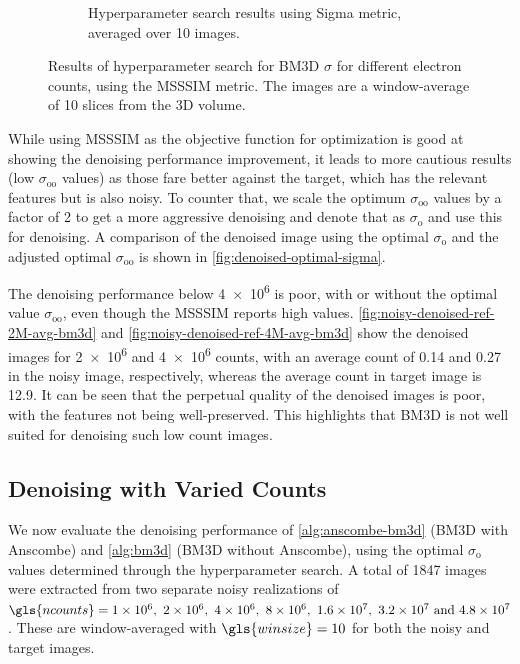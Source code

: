 \begin{figure}
\begin{subfigure}[t]{0.49\linewidth}
        \caption{Hyperparameter search results using Sigma metric, averaged over 10 images.}
        \label{fig:hyperparameter-sigma-averaged-10-images}
    \end{subfigure}
    \caption{Results of hyperparameter search for \gls{BM3D} $\sigma$ for different electron counts, using the \gls{MSSSIM} metric. The images are a window-average of \num{10} slices from the 3D volume.}
    \label{fig:hyperparameter-averaged-10-images}
\end{figure}



While using \gls{MSSSIM} as the objective function for optimization is good at showing the denoising performance improvement, it leads to more cautious results (low $\sigma_{\text{oo}}$ values) as those fare better against the target, which has the relevant features but is also noisy. To counter that, we scale the optimum $\sigma_{\text{oo}}$ values by a factor of 2 to get a more aggressive denoising and denote that as $\sigma_{\text{o}}$ and use this for denoising. A comparison of the denoised image using the optimal $\sigma_{\text{o}}$ and the adjusted optimal $\sigma_{\text{oo}}$ is shown in \cref{fig:denoised-optimal-sigma}.

The denoising performance below \num{4e6} is poor, with or without the optimal value $\sigma_{\text{oo}}$, even though the \gls{MSSSIM} reports high values. \cref{fig:noisy-denoised-ref-2M-avg-bm3d} and \cref{fig:noisy-denoised-ref-4M-avg-bm3d} show the denoised images for \num{2e6} and \num{4e6} counts, with an average count of \num{0.14} and \num{0.27} in the noisy image, respectively, whereas the average count in target image is \num{12.9}. It can be seen that the perpetual quality of the denoised images is poor, with the features not being well-preserved. This highlights that \gls{BM3D} is not well suited for denoising such low count images.

\subsection{Denoising with Varied Counts}
We now evaluate the denoising performance of \cref{alg:anscombe-bm3d} (\gls{BM3D} with Anscombe) and \cref{alg:bm3d} (\gls{BM3D} without Anscombe), using the optimal $\sigma_{\text{o}}$ values determined through the hyperparameter search. A total of \num{1847} images were extracted from two separate noisy realizations of $\gls{ncounts}=\numlist{1e6;2e6;4e6;8e6;1.6e7;3.2e7;4.8e7}$. These are window-averaged with $\gls{winsize}=10$ for both the noisy and target images. 

